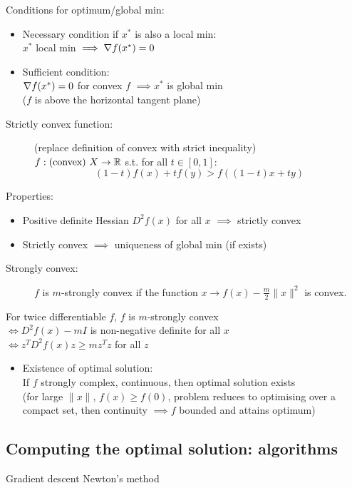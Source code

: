 Conditions for optimum/global min:
\begin{itemize}
    \item Necessary condition if $x^*$ is also a local min: \\
          $x^*$ local min $\implies \mathbf{\nabla} f(x^*) = 0$
    \item Sufficient condition: \\
          $\mathbf{\nabla} f(x^*) = 0$ for convex $f$ $\implies x^*$ is global min \\
          ($f$ is above the horizontal tangent plane)
\end{itemize}


\begin{description}
    \item[Strictly convex function:]  (replace definition of convex with strict inequality) \\
          $f : \text{(convex) } X \to \mathbb{R}$ s.t. for all $t \in [0,1]$: \[(1-t)f(x) + tf(y) > f((1-t)x + ty)\]
\end{description}

Properties:
\begin{itemize}
    \item Positive definite Hessian $D^2f(x)$ for all $x$ $\implies$ strictly convex
    \item Strictly convex $\implies$ uniqueness of global min (if exists)
\end{itemize}


\begin{description}
    \item[Strongly convex:]
          $f$ is $m$-strongly convex if the function $x \to f(x) - \frac{m}{2} \|x\|^2$ is convex.
\end{description}

For twice differentiable $f$, $f$ is $m$-strongly convex \\
$\iff D^2f(x) -mI$ is non-negative definite for all $x$\\
$\iff z^TD^2f(x)z \geq m z^Tz$ for all $z$

\begin{itemize}
    \item Existence of optimal solution: \\
          If $f$ strongly complex, continuous, then optimal solution exists \\
          (for large $\|x\|$, $f(x) \geq f(0)$, problem reduces to optimising over a compact set, then continuity $\implies f$ bounded and attains optimum)
\end{itemize}



\subsection*{Computing the optimal solution: algorithms}
Gradient descent
Newton's method



